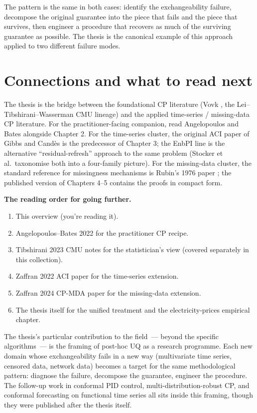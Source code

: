 \documentclass[letterpaper,11pt,leqno]{article}
\newcommand{\bib}{paper.bib}
\begin{document}
The pattern is the same in both cases: identify the exchangeability failure, decompose the original guarantee into the piece that fails and the piece that survives, then engineer a procedure that recovers as much of the surviving guarantee as possible. The thesis is the canonical example of this approach applied to two different failure modes.

\section{Connections and what to read next}\label{s:discussion}

The thesis is the bridge between the foundational CP literature (Vovk \cite{vovk2005algorithmic}, the Lei--Tibshirani--Wasserman CMU lineage) and the applied time-series / missing-data CP literature. For the practitioner-facing companion, read Angelopoulos and Bates \cite{angelopoulos2022gentle} alongside Chapter 2. For the time-series cluster, the original ACI paper of Gibbs and Cand\`es \cite{gibbs2021aci} is the predecessor of Chapter 3; the EnbPI line \cite{xu2023enbpi} is the alternative ``residual-refresh'' approach to the same problem (Stocker et al.\ taxonomise both into a four-family picture). For the missing-data cluster, the standard reference for missingness mechanisms is Rubin's 1976 paper \cite{rubin1976missing}; the published version of Chapters 4--5 \cite{zaffran2024missing} contains the proofs in compact form.

\begin{explain}
\textbf{The reading order for going further.}
\begin{enumerate}
\item This overview (you're reading it).
\item Angelopoulos--Bates 2022 \cite{angelopoulos2022gentle} for the practitioner CP recipe.
\item Tibshirani 2023 CMU notes for the statistician's view (covered separately in this collection).
\item Zaffran 2022 ACI paper \cite{zaffran2022aci} for the time-series extension.
\item Zaffran 2024 CP-MDA paper \cite{zaffran2024missing} for the missing-data extension.
\item The thesis itself for the unified treatment and the electricity-prices empirical chapter.
\end{enumerate}
\end{explain}

The thesis's particular contribution to the field~--- beyond the specific algorithms~--- is the framing of post-hoc UQ as a research programme. Each new domain whose exchangeability fails in a new way (multivariate time series, censored data, network data) becomes a target for the same methodological pattern: diagnose the failure, decompose the guarantee, engineer the procedure. The follow-up work in conformal PID control, multi-distribution-robust CP, and conformal forecasting on functional time series all sits inside this framing, though they were published after the thesis itself.


\end{document}
